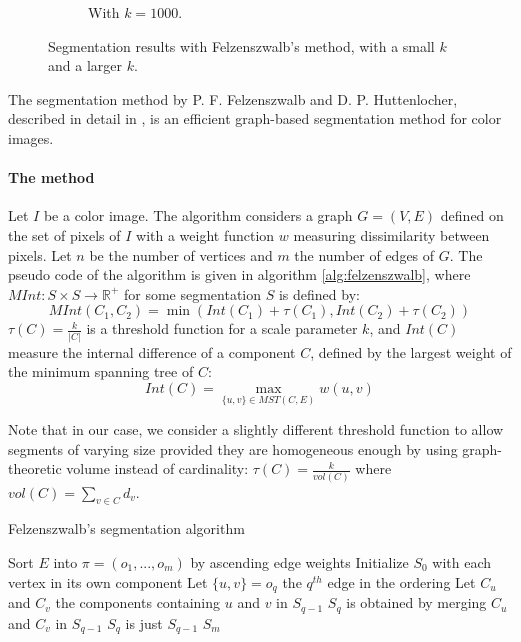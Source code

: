 \begin{figure}[htb!]
\begin{subfigure}{.3\textwidth}
\caption{With $k = 1000$.}
\label{fig:largeKSegmentation}
\end{subfigure}
\caption{Segmentation results with Felzenszwalb's method, with a small $k$ and a larger $k$.}
\end{figure}

The segmentation method by P. F. Felzenszwalb and D. P. Huttenlocher, described in detail in \cite{felzenszwalb2004efficient}, is an efficient graph-based segmentation method for color images.

\paragraph{The method} Let $I$ be a color image. The algorithm considers a graph $G = (V,E)$ defined on the set of pixels of $I$ with a weight function $w$ measuring dissimilarity between pixels. Let $n$ be the number of vertices and $m$ the number of edges of $G$. The pseudo code of the algorithm is given in algorithm \autoref{alg:felzenszwalb}, where $MInt : S \times S \rightarrow \mathbb{R}^+$ for some segmentation $S$ is defined by:
\[
MInt(C_1, C_2) = \min(Int(C_1) + \tau(C_1), Int(C_2) + \tau(C_2))
\]
$\tau(C) = \frac{k}{|C|}$ is a threshold function for a scale parameter $k$, and $Int(C)$ measure the internal difference of a component $C$, defined by
the largest weight of the minimum spanning tree of $C$:
\[
Int(C) = \max_{\{u,v\} \in MST(C, E)} w(u,v)
\]

Note that in our case, we consider a slightly different threshold function to allow segments of varying size provided they are homogeneous enough by using graph-theoretic volume instead of cardinality: $\tau(C) = \frac{k}{vol(C)}$ where $vol(C) = \sum_{v \in C} d_v$.

\begin{algorithm}
\caption{Felzenszwalb's segmentation algorithm}
\label{alg:felzenszwalb}

\begin{algorithmic}[1]
\State Sort $E$ into $\pi = (o_1, ..., o_m)$ by ascending edge weights
\State Initialize $S_0$ with each vertex in its own component
\State Let $\{u,v\} = o_q$ the $q^{th}$ edge in the ordering
\State Let $C_u$ and $C_v$ the components containing $u$ and $v$ in $S_{q-1}$
\State $S_q$ is obtained by merging $C_u$ and $C_v$ in $S_{q-1}$
\Else
\State $S_q$ is just $S_{q-1}$
\EndIf
\EndFor
\Return $S_m$
\EndFunction
\end{algorithmic}
\end{algorithm}

